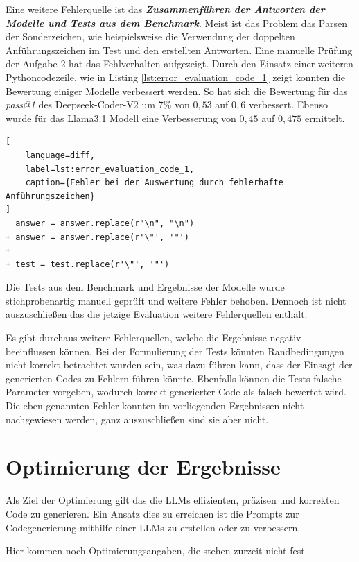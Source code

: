 Eine weitere Fehlerquelle ist das \textit{\textbf{Zusammenführen der Antworten der Modelle und Tests aus dem Benchmark}}. Meist ist das Problem das Parsen der Sonderzeichen, wie beispielsweise die Verwendung der doppelten Anführungszeichen im Test und den erstellten Antworten. Eine manuelle Prüfung der Aufgabe 2 hat das Fehlverhalten aufgezeigt. Durch den Einsatz einer weiteren Pythoncodezeile, wie in Listing \ref{lst:error_evaluation_code_1} zeigt konnten die Bewertung einiger Modelle verbessert werden. So hat sich die Bewertung für das \textit{pass@1} des Deepseek-Coder-V2 um 7\% von $0,53$ auf $0,6$ verbessert. Ebenso wurde für das Llama3.1 Modell eine Verbesserung von $0,45$ auf $0,475$ ermittelt.\vspace{0.2cm}

\begin{lstlisting}[
	language=diff,
	label=lst:error_evaluation_code_1,
	caption={Fehler bei der Auswertung durch fehlerhafte Anführungszeichen}
]
  answer = answer.replace(r"\n", "\n")
+ answer = answer.replace(r'\"', '"')
+ 
+ test = test.replace(r'\"', '"') 
\end{lstlisting}

Die Tests aus dem Benchmark und Ergebnisse der Modelle wurde stichprobenartig manuell geprüft und weitere Fehler behoben. Dennoch ist nicht auszuschließen das die jetzige Evaluation weitere Fehlerquellen enthält.\vspace{0.2cm}

Es gibt durchaus weitere Fehlerquellen, welche die Ergebnisse negativ beeinflussen können. Bei der Formulierung der Tests könnten Randbedingungen nicht korrekt betrachtet wurden sein, was dazu führen kann, dass der Einsagt der generierten Codes zu Fehlern führen könnte. Ebenfalls können die Tests falsche Parameter vorgeben, wodurch korrekt generierter Code als falsch bewertet wird. Die eben genannten Fehler konnten im vorliegenden Ergebnissen nicht nachgewiesen werden, ganz auszuschließen sind sie aber nicht.



\section{Optimierung der Ergebnisse}
Als Ziel der Optimierung gilt das die LLMs effizienten, präzisen und korrekten Code zu generieren. Ein Ansatz dies zu erreichen ist die Prompts zur Codegenerierung mithilfe einer LLMs zu erstellen oder zu verbessern.

\begin{tcolorbox}[
	enhanced,
	colback=red!5!white,
	colframe=red!75!black!50,
	title= Mein roter Faden
	]
	Hier kommen noch Optimierungsangaben, die stehen zurzeit nicht fest.
\end{tcolorbox}
